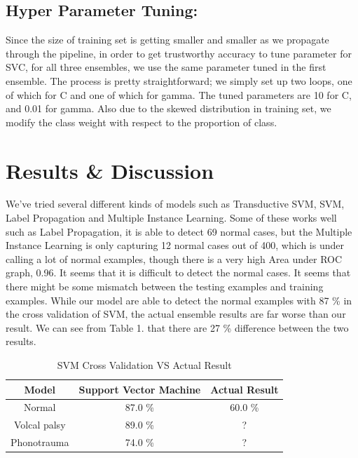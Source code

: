 \documentclass[conference]{IEEEtran}
\begin{document}
	\subsection{Hyper Parameter Tuning:}
		Since the size of training set is getting smaller and smaller as we propagate through the pipeline, in order to get trustworthy accuracy to tune parameter for SVC, for all three ensembles, we use the same parameter tuned in the first ensemble. The process is pretty straightforward; we simply set up two loops, one of which for C and one of which for gamma. The tuned parameters are 10 for C, and 0.01 for gamma. Also due to the skewed distribution in training set, we modify the class weight with respect to the proportion of class. 


\section{Results \& Discussion}

We've tried several different kinds of models such as Transductive SVM, SVM, Label Propagation and Multiple Instance Learning. Some of these works well such as Label Propagation, it is able to detect 69 normal cases, but the Multiple Instance Learning is only capturing 12 normal cases out of 400, which is under calling a lot of normal examples, though there is a very high Area under ROC graph, 0.96. It seems that it is difficult to detect the normal cases. It seems that there might be some mismatch between the testing examples and training examples. While our model are able to detect the normal examples with 87 \% in the cross validation of SVM, the actual ensemble results are far worse than our result. We can see from Table 1. that there are 27 \% difference between the two results.


\begin{table}[htbp]
	\caption{SVM Cross Validation VS Actual Result}
	\begin{center}
		\begin{tabular}{|c|c|c|}
			\hline
			Model & Support Vector Machine & Actual Result \\
			\hline
			Normal & 87.0 \% & 60.0 \% \\
			\hline
			Volcal palsy & 89.0 \% & ?\\
			\hline
			Phonotrauma & 74.0 \% & ?\\
			\hline
		\end{tabular}
		\label{tab2}
	\end{center}
\end{table}
\end{document}
